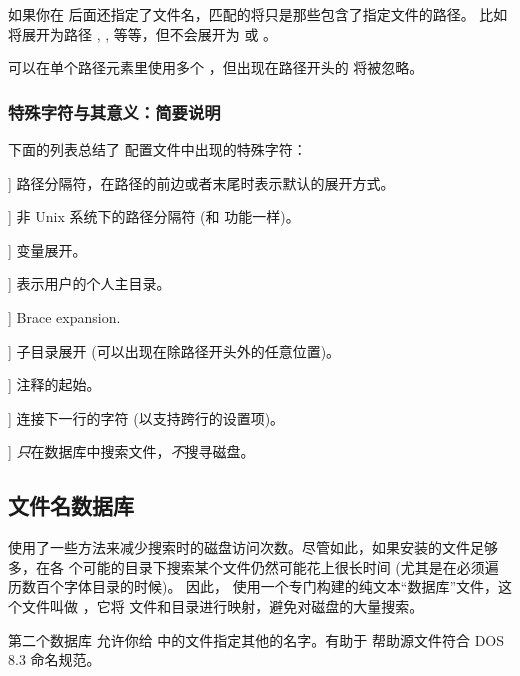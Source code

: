 \documentclass{article}
\begin{document}
如果你在 \samp{//} 后面还指定了文件名，匹配的将只是那些包含了指定文件的路径。
比如  将展开为路径 , ,
 等等，但不会展开为  或 。

可以在单个路径元素里使用多个 \samp{//}，但出现在路径开头的 \samp{//}
将被忽略。

\subsubsection{特殊字符与其意义：简要说明}

下面的列表总结了 \KPS{} 配置文件中出现的特殊字符：

\newcommand{\CODE}[1]{\makebox[3em][l]{\code{#1}}}
\begin{ttdescription}
\item[\CODE{:}] 路径分隔符，在路径的前边或者末尾时表示默认的展开方式。\par
\item[\CODE{;}] 非 Unix 系统下的路径分隔符 (和 \code{:} 功能一样)。
\item[\CODE{\$}] 变量展开。
\item[\CODE{\string~}] 表示用户的个人主目录。
\item[\CODE{\char`\{...\char`\}}] Brace expansion.
\item[\CODE{//}] 子目录展开 (可以出现在除路径开头外的任意位置)。
\item[\CODE{\%}] 注释的起始。
\item[\CODE{\bs}] 连接下一行的字符 (以支持跨行的设置项)。
\item[\CODE{!!}] \emph{只}在数据库中搜索文件，\emph{不}搜寻磁盘。
\end{ttdescription}


\subsection{文件名数据库}
\label{sec:filename-database}

\KPS{} 使用了一些方法来减少搜索时的磁盘访问次数。尽管如此，如果安装的文件足够多，在各
个可能的目录下搜索某个文件仍然可能花上很长时间 (尤其是在必须遍历数百个字体目录的时候)。
因此，\KPS{} 使用一个专门构建的纯文本``数据库''文件，这个文件叫做 ，它将
文件和目录进行映射，避免对磁盘的大量搜索。

第二个数据库  允许你给  中的文件指定其他的名字。有助于
帮助源文件符合 DOS 8.3 命名规范。
\end{document}

